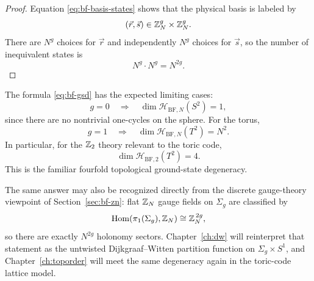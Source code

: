 \begin{proof}
Equation \eqref{eq:bf-basis-states} shows that the physical basis is labeled by
\begin{equation*}
(\vec r,\vec s)\in \mathbb{Z}_N^g\times \mathbb{Z}_N^g.
\end{equation*}
There are $N^g$ choices for $\vec r$ and independently $N^g$ choices for $\vec s$, so the number of inequivalent states is
\begin{equation*}
N^g\cdot N^g=N^{2g}.
\end{equation*}
\end{proof}

\begin{remark}\label{rem:bf-gsd-checks}
The formula \eqref{eq:bf-gsd} has the expected limiting cases:
\begin{equation*}
g=0
\quad\Longrightarrow\quad
\dim \mathcal{H}_{\mathrm{BF},N}(S^2)=1,
\end{equation*}
since there are no nontrivial one-cycles on the sphere. For the torus,
\begin{equation*}
g=1
\quad\Longrightarrow\quad
\dim \mathcal{H}_{\mathrm{BF},N}(T^2)=N^2.
\end{equation*}
In particular, for the $\mathbb{Z}_2$ theory relevant to the toric code,
\begin{equation*}
\dim \mathcal{H}_{\mathrm{BF},2}(T^2)=4.
\end{equation*}
This is the familiar fourfold topological ground-state degeneracy.

\medskip

\noindent The same answer may also be recognized directly from the discrete gauge-theory viewpoint of Section~\ref{sec:bf-zn}: flat $\mathbb{Z}_N$ gauge fields on $\Sigma_g$ are classified by
\begin{equation*}
\operatorname{Hom}(\pi_1(\Sigma_g),\mathbb{Z}_N)\cong \mathbb{Z}_N^{\,2g},
\end{equation*}
so there are exactly $N^{2g}$ holonomy sectors. Chapter~\ref{ch:dw} will reinterpret that statement as the untwisted Dijkgraaf--Witten partition function on $\Sigma_g\times S^1$, and Chapter~\ref{ch:toporder} will meet the same degeneracy again in the toric-code lattice model.
\end{remark}
